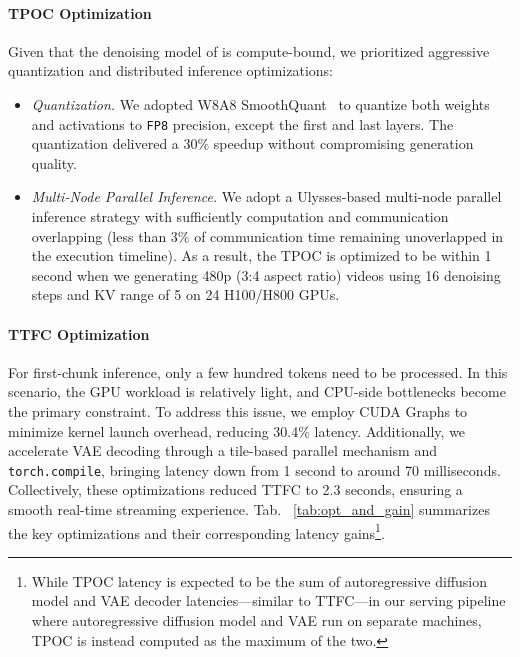 \paragraph{TPOC Optimization}
Given that the denoising model of \magi is compute-bound, we prioritized aggressive quantization and distributed inference optimizations:

\begin{itemize} \item \emph{Quantization.} We adopted W8A8 SmoothQuant~\cite{xiao2023smoothquant} to quantize both weights and activations to \texttt{FP8} precision, except the first and last layers. The quantization delivered a $30\%$ speedup without compromising generation quality. 

\item \emph{Multi-Node Parallel Inference.} We adopt a Ulysses-based multi-node parallel inference strategy with sufficiently computation and communication overlapping (less than $3\%$ of communication time remaining unoverlapped in the execution timeline). As a result, the TPOC is optimized to be within 1 second when we generating 480p (3:4 aspect ratio) videos using 16 denoising steps and KV range of 5 on 24 H100/H800 GPUs.
\end{itemize}

\paragraph{TTFC Optimization}

For first-chunk inference, only a few hundred tokens need to be processed. In this scenario, the GPU workload is relatively light, and CPU-side bottlenecks become the primary constraint. To address this issue, we employ CUDA Graphs to minimize kernel launch overhead, reducing 30.4\% latency. Additionally, we accelerate VAE decoding through a tile-based parallel mechanism and \texttt{torch.compile}, bringing latency down from 1 second to around 70 milliseconds. Collectively, these optimizations reduced TTFC to 2.3 seconds, ensuring a smooth real-time streaming experience. Tab. ~\ref{tab:opt_and_gain} summarizes the key optimizations and their corresponding latency gains\footnote{While TPOC latency is expected to be the sum of autoregressive diffusion model and VAE decoder latencies—similar to TTFC—in our serving pipeline where autoregressive diffusion model and VAE run on separate machines, TPOC is instead computed as the maximum of the two.}.









